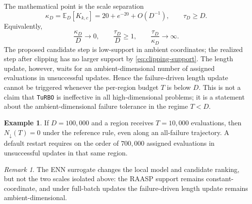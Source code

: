\documentclass[10pt]{article}
\numberwithin{equation}{section}
\newcommand{\TuRBO}{\textnormal{\texttt{TuRBO}}}
\theoremstyle{plain}
\theoremstyle{definition}
\newtheorem{example}{Example}
\theoremstyle{remark}
\newtheorem{remark}{Remark}
\begin{document}
The mathematical point is the scale separation
\begin{equation}
  \kappa_D
  =
  \mathbb{E}_D\!\left[K_{k,c}\right]
  =
  20+e^{-20}+O(D^{-1}),
  \qquad
  \tau_D\ge D.
  \label{eq:scale-separation}
\end{equation}
Equivalently,
\begin{equation}
  \frac{\kappa_D}{D}\to0,
  \qquad
  \frac{\tau_D}{D}\ge1,
  \qquad
  \frac{\tau_D}{\kappa_D}\to\infty .
  \label{eq:normalized-separation}
\end{equation}
The proposed candidate step is low-support in ambient coordinates; the realized
step after clipping has no larger support by \eqref{eq:clipping-support}.  The
length update, however, waits for an ambient-dimensional number of assigned
evaluations in unsuccessful updates.  Hence the failure-driven length update
cannot be triggered whenever the per-region budget \(T\) is below \(D\).  This
is not a claim that \TuRBO{} is ineffective in all high-dimensional problems;
it is a statement about the ambient-dimensional failure tolerance in the regime
\(T<D\).

\begin{example}
If \(D=100{,}000\) and a region receives \(T=10{,}000\) evaluations, then
\(N_{\downarrow}(T)=0\) under the reference rule, even along an all-failure
trajectory.  A default restart requires on the order of \(700{,}000\) assigned
evaluations in unsuccessful updates in that same region.
\end{example}

\begin{remark}
The ENN surrogate changes the local model and candidate ranking, but not the two
scales isolated above: the RAASP support remains constant-coordinate, and under
full-batch updates the failure-driven length update remains ambient-dimensional.
\end{remark}
\end{document}

